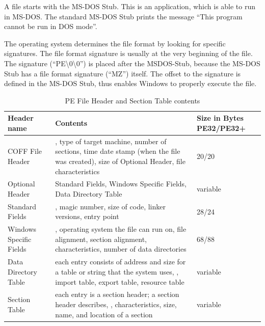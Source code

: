 A \PE{} file starts with the MS-DOS Stub. This is an application, which is able to run in MS-DOS. The standard MS-DOS Stub prints the message \enquote{This program cannot be run in DOS mode}. 

The operating system determines the file format by looking for specific signatures. The file format signature is usually at the very beginning of the file. The \PE{} signature (\enquote{PE\textbackslash{}0\textbackslash{}0}) is placed after the MSDOS-Stub, because the MS-DOS Stub has a file format signature (\enquote{MZ}) itself. The offset to the \PE{} signature is defined in the MS-DOS Stub, thus enables Windows to properly execute the \PE{} file.

\renewcommand{\arraystretch}{1.5}
\begin{table}[h]
	\begin{center}
	\caption[PE File Header contents]{PE File Header and Section Table contents}
	\label{tbl:peheader}
		\begin{tabular}{p{} p{} p{}}
			\toprule
			Header name			& Contents & Size in Bytes PE32/PE32+ \\
			\midrule
			COFF File Header	&  \ia{}, type of target machine, number of sections, time date stamp (when the file was created), size of Optional Header, file characteristics & 20/20\\

		  Optional Header			& Standard Fields, Windows Specific Fields, Data Directory Table & variable\\
      \midrule
      Standard Fields &  \ia{}, magic number, size of code, linker versions, entry point & 28/24\\
			Windows Specific Fields	& \ia{}, operating system the file can run on, file alignment, section alignment, \DLL{} characteristics, number of data directories & 68/88 \\
			Data Directory Table	& each entry consists of address and size for a table or string that the system uses, \eg{}, import table, export table, resource table & variable\\
			\midrule
      Section Table &  each entry is a section header; a section header describes, \ia{}, characteristics, size, name, and location of a section & variable\\
			\bottomrule
		\end{tabular}
	\end{center}
\end{table}

